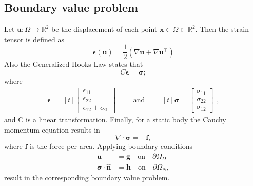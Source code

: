\documentclass[5pt,a4paper,english]{elsarticle}%
\begin{document}
\subsection{Boundary value problem}
Let $\boldsymbol{u} : \Omega \rightarrow \mathbb{R}^2$ be the displacement of each point $\boldsymbol{x} \in \Omega \subset \mathbb{R}^2$. Then the strain tensor is defined as 
\begin{equation} \label{eq-strain-tensor}
    \boldsymbol{\epsilon}(\boldsymbol{u}) = \frac{1}{2}(\nabla \boldsymbol{u} + \nabla \boldsymbol{u}^\intercal)
\end{equation}
Also the Generalized Hooks Law states that
\begin{equation}
    C \boldsymbol{\overline{\epsilon}}  = \boldsymbol{\overline{\sigma}};
    \label{hooks-law}
\end{equation}
where 
\begin{equation*}
    \boldsymbol{\overline{\epsilon}} =\begin{aligned}[t]
    \begin{bmatrix}
        \epsilon_{1 1} \\
        \epsilon_{2 2} \\
        \epsilon_{1 2} + \epsilon_{2 1}
    \end{bmatrix}
    \end{aligned}
    \qquad \text{and} \qquad
    \begin{aligned}[t]
        \boldsymbol{\overline{\sigma}} = \begin{bmatrix}
            \sigma_{1 1} \\
            \sigma_{2 2} \\
            \sigma_{1 2} 
        \end{bmatrix}
    \end{aligned},
\end{equation*}
and C is a linear transformation.
Finally, for a static body the Cauchy momentum equation results in 
\begin{equation} \label{eq-cauchy-momentum}
    \nabla \cdot \boldsymbol{\sigma} = -\boldsymbol{f},
\end{equation}
where $\boldsymbol{f}$ is the force per area. Applying boundary conditions 
\begin{align}
    \boldsymbol{u}  &= \boldsymbol{g} \quad \text{on} \quad \partial\Omega_D   \\
    \boldsymbol{\sigma} \cdot \boldsymbol{\hat{n}}  &=  \boldsymbol{h} \quad \text{on} \quad \partial\Omega_N,
    \label{elasticity-bc}
\end{align}
result in the corresponding boundary value problem. 
\end{document}
